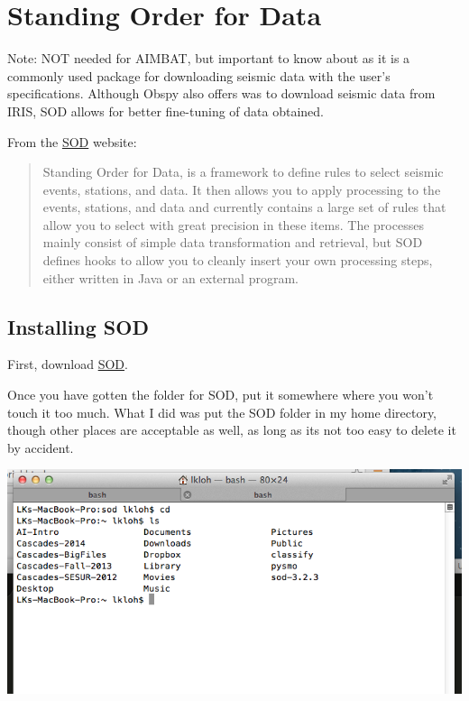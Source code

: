 \documentclass[letterpaper,10pt,english]{sphinxmanual}
\begin{document}
\section{Standing Order for Data}
\label{docfiles/gettingData:standing-order-for-data}
Note: NOT needed for AIMBAT, but important to know about as it is a commonly used package for downloading seismic data with the user's specifications. Although Obspy also offers was to download seismic data from IRIS, SOD allows for better fine-tuning of data obtained.

From the \href{http://www.seis.sc.edu/index.html}{SOD} website:
\begin{quote}

Standing Order for Data, is a framework to define rules to select seismic events, stations, and data. It then allows you to apply processing to the events, stations, and data and currently contains a large set of rules that allow you to select with great precision in these items. The processes mainly consist of simple data transformation and retrieval, but SOD defines hooks to allow you to cleanly insert your own processing steps, either written in Java or an external program.
\end{quote}


\subsection{Installing SOD}
\label{docfiles/gettingData:installing-sod}
First, download \href{http://www.seis.sc.edu/index.html}{SOD}.

Once you have gotten the folder for SOD, put it somewhere where you won't touch it too much. What I did was put the SOD folder in my home directory, though other places are acceptable as well, as long as its not too easy to delete it by accident.

\includegraphics{sod_location.png}
\end{document}
